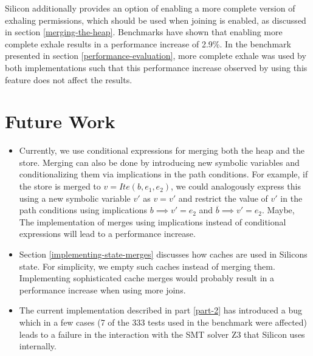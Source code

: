 \documentclass[11pt]{article}
\begin{document}
    Silicon additionally provides an option of enabling a more complete version
    of exhaling permissions, which should be used when joining is enabled,
    as discussed in section \ref{merging-the-heap}.
    Benchmarks have shown that enabling more complete 
    exhale results in a performance increase of 2.9\%. In the benchmark presented
    in section \ref{performance-evaluation}, more complete exhale was used
    by both implementations such that this performance increase observed by using this feature
    does not affect the results.


    \newpage
    \section{Future Work}

    \begin{itemize}
        \item Currently, we use conditional expressions for merging both
            the heap and the store. Merging can also be done by introducing
            new symbolic variables and conditionalizing them via implications
            in the path conditions. For example, if the store is merged to
            $v = Ite(b, e_1, e_2)$, we could analogously express this using
            a new symbolic variable $v'$ as
            $v = v'$ and restrict the value of $v'$ in the path conditions using implications
            $b \implies v' = e_2$ and $\overline{b} \implies v' = e_2$.
            Maybe, The implementation of merges using
            implications instead of conditional expressions
            will lead to a performance increase.
        \item Section \ref{implementing-state-merges} discusses how caches are
            used in Silicons state. For simplicity, we empty such caches
            instead of merging them. Implementing sophisticated cache merges would
            probably result in a performance increase when using more joins.
        \item The current implementation described in part \ref{part-2}
            has introduced a bug which in a few cases (7 of the 333
            tests used in the benchmark were affected) leads to a failure
            in the interaction with the SMT solver Z3 that Silicon
            uses internally.
    \end{itemize}

    \newpage
    \printbibliography
    
\end{document}
